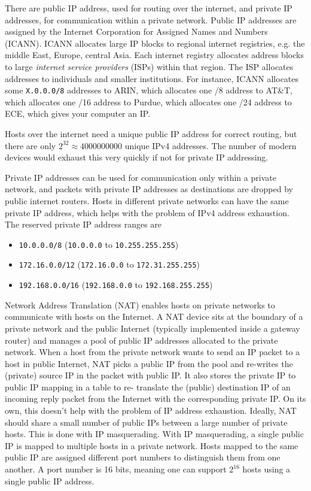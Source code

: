 There are public IP address, used for routing over the internet, and private IP
addresses, for communication within a private network. Public IP addresses are
assigned by the Internet Corporation for Assigned Names and Numbers (ICANN).
ICANN allocates large IP blocks to regional internet registries, e.g. the middle East,
Europe, central Asia. Each internet registry allocates address blocks to large \emph{internet
    service providers} (ISPs) within that region. The ISP allocates addresses to individuals
and smaller institutions. For instance, ICANN allocates some \texttt{X.0.0.0/8} addresses
to ARIN, which allocates one /8 address to AT\&T, which allocates
one /16 address to Purdue, which allocates one /24 address to ECE, which gives your
computer an IP.

Hosts over the internet need a unique public IP address for correct routing, but
there are only $2^{32} \approx 4000000000$ unique IPv4 addresses. The number of
modern devices would exhaust this very quickly if not for private IP addressing.

Private IP addresses can be used for communication only within a private network,
and packets with private IP addresses as destinations are dropped by public internet
routers. Hosts in different private networks can have the same private IP address,
which helps with the problem of IPv4 address exhaustion. The reserved private IP
address ranges are
\begin{itemize}
    \item \texttt{10.0.0.0/8} (\texttt{10.0.0.0} to \texttt{10.255.255.255})
    \item \texttt{172.16.0.0/12} (\texttt{172.16.0.0} to \texttt{172.31.255.255})
    \item \texttt{192.168.0.0/16} (\texttt{192.168.0.0} to \texttt{192.168.255.255})
\end{itemize}

Network Address Translation (NAT)
enables hosts on private networks to
communicate with hosts on the Internet.
A NAT device sits at the boundary of a private network and the
public Internet (typically implemented inside a gateway router)
and manages a pool of public IP addresses allocated to the
private network.
When a host from the private network wants to send an IP packet
to a host in public Internet, NAT picks a public IP from the pool and
re-writes the (private) source IP in the packet with public IP.
It also stores the private IP to public IP mapping in a table to re-
translate the (public) destination IP of an incoming reply packet
from the Internet with the corresponding private IP.
On its own, this doesn't help with the problem of IP address exhaustion.
Ideally, NAT should share a small number of public IPs
between a large number of private hosts. This is done with IP
masquerading.
With IP masquerading, a single public IP is mapped to multiple
hosts in a private network.
Hosts mapped to the same public IP are assigned different
port numbers to distinguish them from one another.
A port number is 16 bits, meaning one can support $2^16$ hosts
using a single public IP address.

